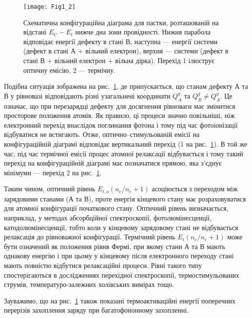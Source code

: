 \begin{figure}[t]
\center
\vspace{-5mm}
\texttt{[image: Fig1\_2]}
\vspace{-3mm}
\caption{Схематична конфігураційна діаграма для пастки,
розташованій на відстані $E_C-E_{t}$ нижче дна зони провідності.
Нижня парабола відповідає енергії дефекту в стані В,
наступна --- енергії системи (дефект в стані А + вільний електрон),
верхня --- системи (дефект в стані В + вільний електрон + вільна дірка). %
Перехід 1 ілюструє оптичну емісію, 2 --- термічну.}
\vspace{-3mm}
\label{F12}
\end{figure}

Подібна ситуація зображена на рис.~\ref{F12},
де припускається, що станам дефекту А та В у рівновазі
відповідають різні узагальнені координати $Q_A^g$ та $Q_B^g\neq Q_A^g$.
Це означає, що при перезарядці дефекту для досягнення рівноваги
має змінитися просторове положення атомів.
Як правило, ці процеси значно повільніші, ніж електронний перехід
внаслідок поглинання фотона і тому під час фотоіонізації відбуватися не встигають.
Отже, оптично--стимульованій емісії на конфігураційній діаграмі відповідає вертикальний перехід
(1 на рис.~\ref{F12}).
В той же час, під час термічної емісії процес атомної релаксації  відбувається і тому
такий перехід на конфігураційній діаграмі має позначатися прямою, яка з'єднує мінімуми ---
перехід 2 на рис.~\ref{F12}.

Таким чином, оптичний рівень $E_{t,o}(n_e/n_e+1)$ асоціюється
з переходом між зарядовими станами (А та В), проте енергія кінцевого
стану має розраховуватися для атомної конфігурації початкового стану.
Оптичний рівень визначається, наприклад, у методах абсорбційної спектроскопії,
фотолюмінесценції, катодолюмінесценції, тобто коли у кінцевому
зарядовому стані не відбувається релаксація до рівноважної конфігурації.
Термічний рівень $E_{t}(n_e/n_e+1)$ може бути означений як положення рівня Фермі,
при якому стани А та В мають однакову енергію і при цьому у кінцевому після електронного переходу стані
мають повністю відбутися релаксаційні процеси.
Рівні такого типу спостерігаються в дослідженнях перехідної спектроскопії,
термостимульованих струмів, температуро-залежних холівських вимірах тощо.

Зауважимо, що на рис.~\ref{F12} також показані термоактиваційні енергії поперечних перерізів захоплення
заряду при багатофононному захопленні.
